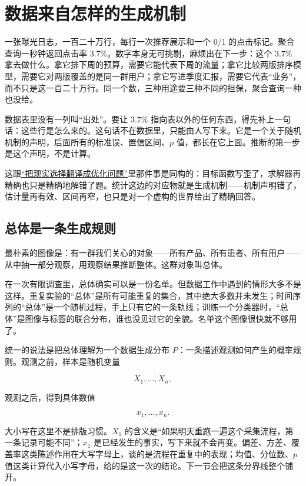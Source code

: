 \section{数据来自怎样的生成机制}
\label{sec:11-Mathematical-Statistics/01-Statistical-Models/01}

一张曝光日志，一百二十万行，每行一次推荐展示和一个 0/1 的点击标记。聚合查询一秒钟返回点击率 \(3.7\%\)。数字本身无可挑剔，麻烦出在下一步：这个 \(3.7\%\) 拿去做什么。拿它排下周的预算，需要它能代表下周的流量；拿它比较两版排序模型，需要它对两版覆盖的是同一群用户；拿它写进季度汇报，需要它代表``业务''，而不只是这一百二十万行。同一个数，三种用途要三种不同的担保，聚合查询一种也没给。

数据表里没有一列叫``出处''。要让 \(3.7\%\) 指向表以外的任何东西，得先补上一句话：这些行是怎么来的。这句话不在数据里，只能由人写下来。它是一个关于随机机制的声明，后面所有的标准误、置信区间、\(p\) 值，都长在它上面。推断的第一步是这个声明，不是计算。

这跟\hyperref[sec:09-Convex-Optimization/01-Optimization-Foundations/01]{``把现实选择翻译成优化问题''}里那件事是同构的：目标函数写歪了，求解器再精确也只是精确地解错了题。统计这边的对应物就是生成机制——机制声明错了，估计量再有效、区间再窄，也只是对一个虚构的世界给出了精确回答。

\subsection{总体是一条生成规则}

最朴素的图像是：有一群我们关心的对象——所有产品、所有患者、所有用户——从中抽一部分观察，用观察结果推断整体。这群对象叫总体。

在一次有限调查里，总体确实可以是一份名单。但数据工作中遇到的情形大多不是这样。重复实验的``总体''是所有可能重复的集合，其中绝大多数并未发生；时间序列的``总体''是一个随机过程，手上只有它的一条轨线；训练一个分类器时，``总体''是图像与标签的联合分布，谁也没见过它的全貌。名单这个图像很快就不够用了。

统一的说法是把总体理解为一个数据生成分布 \(P\)：一条描述观测如何产生的概率规则。观测之前，样本是随机变量

\[
X_1,\ldots,X_n,
\]

观测之后，得到具体数值

\[
x_1,\ldots,x_n.
\]

大小写在这里不是排版习惯。\(X_1\) 的含义是``如果明天重跑一遍这个采集流程，第一条记录可能不同''；\(x_1\) 是已经发生的事实，写下来就不会再变。偏差、方差、覆盖率这类陈述作用在大写字母上，谈的是流程在重复中的表现；均值、分位数、\(p\) 值这类计算代入小写字母，给的是这一次的结论。下一节会把这条分界线整个铺开。

